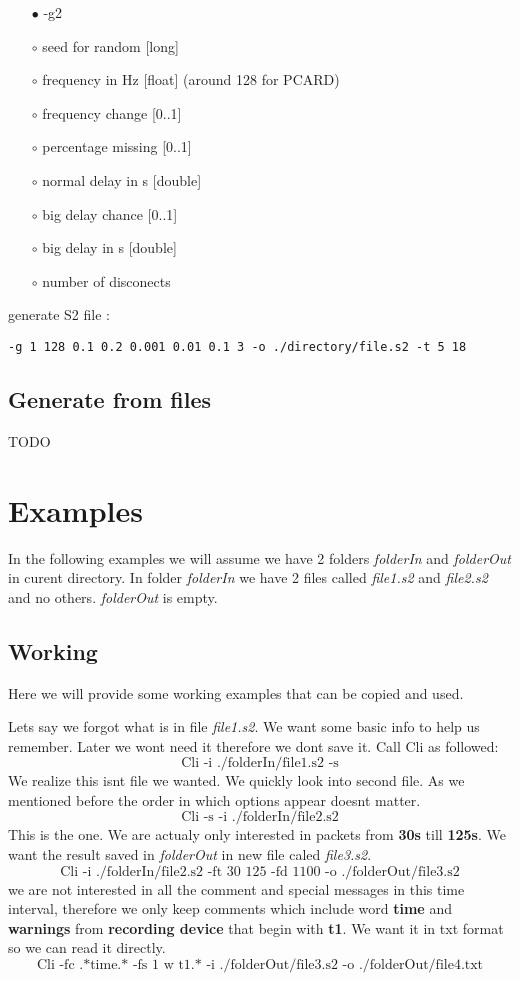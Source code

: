 \documentclass[english]{article}
\begin{document}
\begin{itemize}
\item[$\bullet$] -g2
\item[$\circ$] seed for random [long]
\item[$\circ$] frequency in Hz [float] (around 128 for PCARD)
\item[$\circ$] frequency change [0..1]
\item[$\circ$] percentage missing [0..1]
\item[$\circ$] normal delay in s [double]
\item[$\circ$] big delay chance [0..1]
\item[$\circ$] big delay in s [double]
\item[$\circ$] number of disconects

\end{itemize}
generate S2 file : 
\begin{lstlisting} 
-g 1 128 0.1 0.2 0.001 0.01 0.1 3 -o ./directory/file.s2 -t 5 18
\end{lstlisting}

\subsection{Generate from files}

TODO


\section{Examples}

In the following examples we will assume we have 2 folders \textit{folderIn} and \textit{folderOut} in curent directory. In folder \textit{folderIn} we have 2 files called \textit{file1.s2} and \textit{file2.s2} and no others. \textit{folderOut} is empty.

\subsection{Working}
Here we will provide some working examples that can be copied and used. 

Lets say we forgot what is in file \textit{file1.s2}. We want some basic info to help us remember. Later we wont need it therefore we dont save it. Call Cli as followed:
$$\text{Cli -i ./folderIn/file1.s2 -s}$$
We realize this isnt file we wanted. We quickly look into second file. As we mentioned before the order in which options appear doesnt matter.
$$\text{Cli -s -i ./folderIn/file2.s2}$$
This is the one. We are actualy only interested in packets from \textbf{30s} till \textbf{125s}. We want the result saved in \textit{folderOut} in new file caled \textit{file3.s2}.
$$\text{Cli -i ./folderIn/file2.s2 -ft 30 125 -fd 1100 -o ./folderOut/file3.s2}$$
we are not interested in all the comment and special messages in this time interval, therefore we only keep comments which include word \textbf{time} and \textbf{warnings} from \textbf{recording device} that begin with \textbf{t1}. We want it in txt format so we can read it directly.
$$\text{Cli -fc .*time.* -fs 1 w t1.* -i ./folderOut/file3.s2 -o ./folderOut/file4.txt}$$
\end{document}

